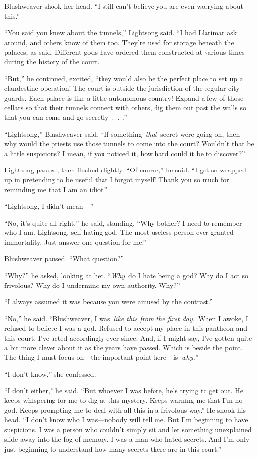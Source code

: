 Blushweaver shook her head. “I still can’t believe you are even worrying about this.”

“You said you knew about the tunnels,” Lightsong said. “I had Llarimar ask around, and others know of them too. They’re used for storage beneath the palaces, as said. Different gods have ordered them constructed at various times during the history of the court.

“But,” he continued, excited, “they would also be the perfect place to set up a clandestine operation! The court is outside the jurisdiction of the regular city guards. Each palace is like a little autonomous country! Expand a few of those cellars so that their tunnels connect with others, dig them out past the walls so that you can come and go secretly~.~.~.”

“Lightsong,” Blushweaver said. “If something~\textit{that}~secret were going on, then why would the priests use those tunnels to come into the court? Wouldn’t that be a little suspicious? I mean, if you noticed it, how hard could it be to discover?”

Lightsong paused, then flushed slightly. “Of course,” he said. “I got so wrapped up in pretending to be useful that I forgot myself! Thank you so much for reminding me that I am an idiot.”

“Lightsong, I didn’t mean—”

“No, it’s quite all right,” he said, standing. “Why bother? I need to remember who I am. Lightsong, self-hating god. The most useless person ever granted immortality. Just answer one question for me.”

Blushweaver paused. “What question?”

“Why?” he asked, looking at her. “\textit{Why}~do I hate being a god? Why do I act so frivolous? Why do I undermine my own authority. Why?”

“I always assumed it was because you were amused by the contrast.”

“No,” he said. “Blushweaver, I was~\textit{like this from the first day.}~When I awoke, I refused to believe I was a god. Refused to accept my place in this pantheon and this court. I’ve acted accordingly ever since. And, if I might say, I’ve gotten quite a bit more clever about it as the years have passed. Which is beside the point. The thing I must focus on—the important point here—is~\textit{why.}”

“I don’t know,” she confessed.

“I don’t either,” he said. “But whoever I was before, he’s trying to get out. He keeps whispering for me to dig at this mystery. Keeps warning me that I’m no god. Keeps prompting me to deal with all this in a frivolous way.” He shook his head. “I don’t know who I was—nobody will tell me. But I’m beginning to have suspicions. I was a person who couldn’t simply sit and let something unexplained slide away into the fog of memory. I was a man who hated secrets. And I’m only just beginning to understand how many secrets there are in this court.”

